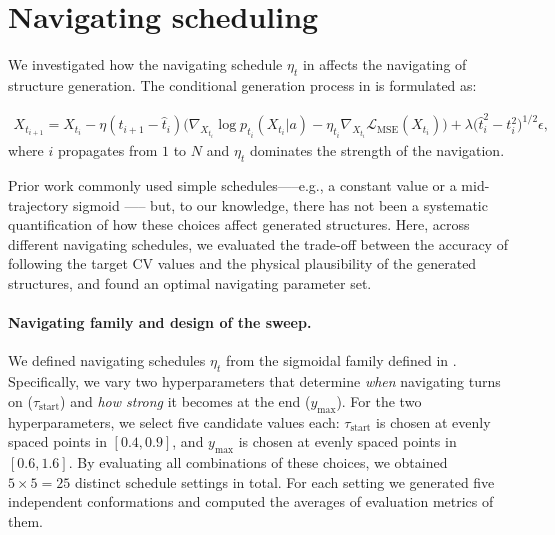 \section{Navigating scheduling}
\label{sec:nav_scheduling}

We investigated how the navigating schedule $\eta_t$ in  affects the navigating of \AFiii structure generation.
The conditional generation process in \AFiii is formulated as:

\begin{equation}
    \begin{split}
        X_{t_{i+1}} = X_{t_i} - \eta (t_{i+1} - \hat{t}_i) \bigl( \nabla_{X_{t_i}} \log p_{t_i}(X_{t_i} | a) - \eta_{t_i} \nabla_{X_{t_i}} \mathcal{L}_{\text{MSE}}(X_{t_i}) \bigr) + \lambda \bigl({\hat{t}_i^2 - t_i^2}\bigr)^{1/2} \epsilon,
        \label{eq:af3-guided-hatt}
    \end{split}
\end{equation}
where $i$ propagates from $1$ to $N$ and $\eta_t$ dominates the strength of the navigation.

Prior work commonly used simple schedules—--e.g., a constant value \cite{maddipatla2025inverse} or a mid-trajectory sigmoid \cite{raghu2025multiscale}—--
but, to our knowledge, there has not been a systematic quantification of how these choices affect generated structures.
Here, across different navigating schedules, we evaluated the trade-off
between the accuracy of following the target CV values and the physical plausibility of the generated structures,
and found an optimal navigating parameter set.

\paragraph{Navigating family and design of the sweep.}
We defined navigating schedules $\eta_t$ from the sigmoidal family defined in .
Specifically, we vary two hyperparameters that determine \emph{when} navigating turns on ($\tau_{\text{start}}$) and \emph{how strong} it becomes at the end ($y_{\text{max}}$).
For the two hyperparameters, we select five candidate values each:
$\tau_{\text{start}}$ is chosen at evenly spaced points in $[0.4,0.9]$,
and $y_{\text{max}}$ is chosen at evenly spaced points in $[0.6,1.6]$.
By evaluating all combinations of these choices, we obtained $5\times 5 = 25$ distinct schedule settings in total.
For each setting we generated five independent conformations and computed the averages of evaluation metrics of them.

